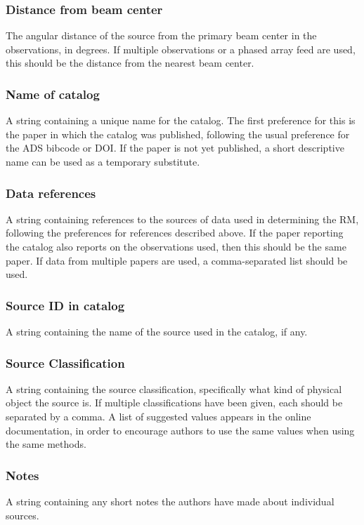 \documentclass[10pt,modern]{aastex63}
\begin{document}
\subsubsection{Distance from beam center}
The angular distance of the source from the primary beam center in the observations, in degrees. If multiple observations or a phased array feed are used, this should be the distance from the nearest beam center.

\subsubsection{Name of catalog}
A string containing a unique name for the catalog. The first preference for this is the paper in which the catalog was published, following the usual preference for the ADS bibcode or DOI. If the paper is not yet published, a short descriptive name can be used as a temporary substitute.

\subsubsection{Data references}
A string containing references to the sources of data used in determining the RM, following the preferences for references described above. If the paper reporting the catalog also reports on the observations used, then this should be the same paper. If data from multiple papers are used, a comma-separated list should be used.

\subsubsection{Source ID in catalog}
A string containing the name of the source used in the catalog, if any.

\subsubsection{Source Classification}
A string containing the source classification, specifically what kind of physical object the source is. If multiple classifications have been given, each should be separated by a comma. A list of suggested values appears in the online documentation, in order to encourage authors to use the same values when using the same methods.

\subsubsection{Notes}
A string containing any short notes the authors have made about individual sources.
\end{document}

